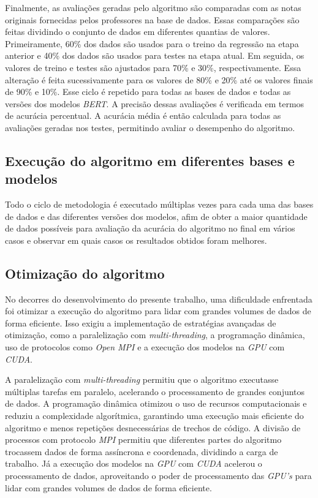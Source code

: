 Finalmente, as avaliações geradas pelo algoritmo são comparadas com as notas originais fornecidas pelos professores na base de dados. Essas comparações são feitas dividindo o conjunto de dados em diferentes quantias de valores. Primeiramente, 60\% dos dados são usados para o treino da regressão na etapa anterior e 40\% dos dados são usados para testes na etapa atual. Em seguida, os valores de treino e testes são ajustados para 70\% e 30\%, respectivamente. Essa alteração é feita sucessivamente para os valores de 80\% e 20\% até os valores finais de 90\% e 10\%. Esse ciclo é repetido para todas as bases de dados e todas as versões dos modelos \textit{BERT}. A precisão dessas avaliações é verificada em termos de acurácia percentual. A acurácia média é então calculada para todas as avaliações geradas nos testes, permitindo avaliar o desempenho do algoritmo.

\subsection{Execução do algoritmo em diferentes bases e modelos}

Todo o ciclo de metodologia é executado múltiplas vezes para cada uma das bases de dados e das diferentes versões dos modelos, afim de obter a maior quantidade de dados possíveis para avaliação da acurácia do algoritmo no final em vários casos e observar em quais casos os resultados obtidos foram melhores.

\subsection{Otimização do algoritmo}

No decorres do desenvolvimento do presente trabalho, uma dificuldade enfrentada foi otimizar a execução do algoritmo para lidar com grandes volumes de dados de forma eficiente. Isso exigiu a implementação de estratégias avançadas de otimização, como a paralelização com \textit{multi-threading}, a programação dinâmica, uso de protocolos como \textit{Open MPI} e a execução dos modelos na \textit{GPU} com \textit{CUDA}.

A paralelização com \textit{multi-threading} permitiu que o algoritmo executasse múltiplas tarefas em paralelo, acelerando o processamento de grandes conjuntos de dados. A programação dinâmica otimizou o uso de recursos computacionais e reduziu a complexidade algorítmica, garantindo uma execução mais eficiente do algoritmo e menos repetições desnecessárias de trechos de código. A divisão de processos com protocolo \textit{MPI} permitiu que diferentes partes do algoritmo trocassem dados de forma assíncrona e coordenada, dividindo a carga de trabalho. Já a execução dos modelos na \textit{GPU} com \textit{CUDA} acelerou o processamento de dados, aproveitando o poder de processamento das \textit{GPU's} para lidar com grandes volumes de dados de forma eficiente.

